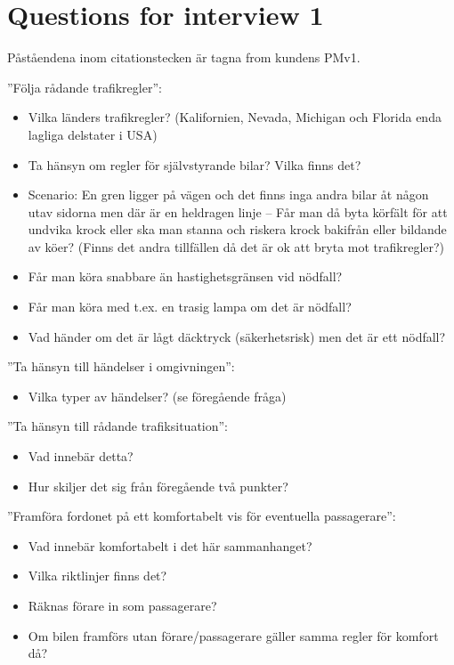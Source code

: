 \documentclass[10pt]{article}
\begin{document}
\appendix
\section{Questions for interview 1}
Påståendena inom citationstecken är tagna from kundens PMv1.

\noindent”Följa rådande trafikregler”:
\begin{itemize}
\item Vilka länders trafikregler? (Kalifornien, Nevada, Michigan och Florida enda lagliga delstater i USA)
\item Ta hänsyn om regler för självstyrande bilar? Vilka finns det?
\item Scenario: En gren ligger på vägen och det finns inga andra bilar åt någon utav sidorna men där är en heldragen linje – Får man då byta körfält för att undvika krock eller ska man stanna och riskera krock bakifrån eller bildande av köer? (Finns det andra tillfällen då det är ok att bryta mot trafikregler?)
\item Får man köra snabbare än hastighetsgränsen vid nödfall?
\item Får man köra med t.ex. en trasig lampa om det är nödfall?
\item Vad händer om det är lågt däcktryck (säkerhetsrisk) men det är ett nödfall?
\end{itemize}
\hfill \break

\noindent ”Ta hänsyn till händelser i omgivningen”:
\begin{itemize}
\item Vilka typer av händelser? (se föregående fråga)
\end{itemize}
\hfill \break

\noindent ”Ta hänsyn till rådande trafiksituation”:
\begin{itemize}
\item Vad innebär detta?
\item Hur skiljer det sig från föregående två punkter?
\end{itemize}
\hfill \break

\noindent ”Framföra fordonet på ett komfortabelt vis för eventuella passagerare”:
\begin{itemize}
\item Vad innebär komfortabelt i det här sammanhanget? 
\item Vilka riktlinjer finns det?
\item Räknas förare in som passagerare?
\item Om bilen framförs utan förare/passagerare gäller samma regler för komfort då?
\end{itemize}
\hfill \break
\end{document}
